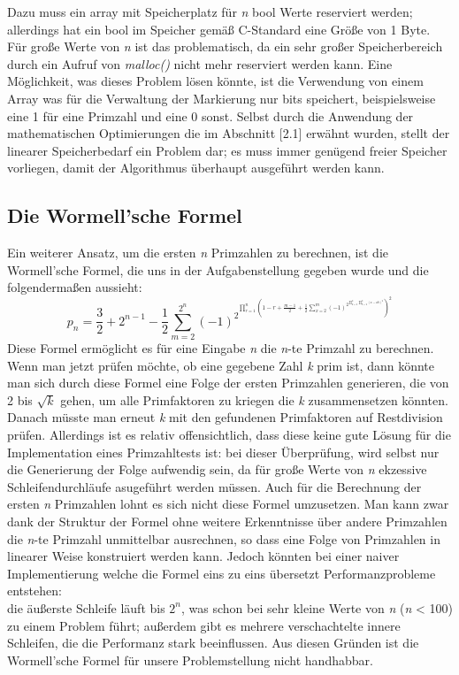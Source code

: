 \documentclass[course=erap]{aspdoc}
\begin{document}
Dazu muss ein array mit Speicherplatz für \textit{n} bool Werte reserviert werden; allerdings 
hat ein bool im Speicher gemäß C-Standard eine Größe von 1 Byte. 
Für große Werte von \textit{n} ist das problematisch, da ein sehr großer Speicherbereich durch ein Aufruf von \textit{malloc()} nicht mehr reserviert werden kann. Eine Möglichkeit, was dieses Problem lösen könnte, ist die Verwendung von einem Array was für die Verwaltung der Markierung nur bits speichert, beispielsweise eine 1 für eine Primzahl und eine 0 sonst. Selbst durch die Anwendung der mathematischen Optimierungen die im Abschnitt [2.1] erwähnt wurden, stellt der linearer Speicherbedarf ein Problem dar; es muss immer genügend freier Speicher vorliegen, damit der Algorithmus überhaupt ausgeführt werden kann. 
\subsection{Die Wormell'sche Formel}
Ein weiterer Ansatz, um die ersten \textit{n} Primzahlen zu berechnen, ist die Wormell’sche Formel, die uns in der Aufgabenstellung gegeben wurde und die folgendermaßen aussieht: $$
p_{n} = \frac{3}{2} + 2^{n - 1} - \frac{1}{2} \sum_{m=2}^{2^n} (-1)^{2^{\prod_{r=1}^{n} \left(1-r + \frac{m-1}{2} + \frac{1}{2} \sum_{x=2}^{m} (-1)^{2^{\prod_{a=2}^{x} \prod_{b=2}^{x} (x-ab)^2}}\right)^2}}
$$
Diese Formel ermöglicht es für eine Eingabe \textit{n} die \textit{n}-te Primzahl zu berechnen. Wenn man jetzt prüfen möchte, ob eine gegebene Zahl \textit{k} prim ist, dann könnte man sich durch diese Formel eine Folge der ersten Primzahlen generieren, die von 2 bis $\sqrt{k}$ gehen, um alle Primfaktoren zu kriegen die \textit{k} zusammensetzen könnten. Danach müsste man erneut \textit{k} mit den gefundenen Primfaktoren auf Restdivision prüfen. Allerdings ist es relativ offensichtlich, dass diese keine gute Lösung für die  Implementation eines Primzahltests ist: bei dieser Überprüfung, wird selbst nur die Generierung der Folge aufwendig sein, da für große Werte von \textit{n} ekzessive Schleifendurchläufe asugeführt werden müssen. Auch für die Berechnung der ersten \textit{n} Primzahlen lohnt es sich nicht diese Formel umzusetzen. Man kann zwar dank der Struktur der Formel ohne weitere Erkenntnisse über andere Primzahlen die \textit{n}-te Primzahl unmittelbar ausrechnen, so dass eine Folge von Primzahlen in linearer Weise konstruiert werden kann. Jedoch könnten bei einer naiver Implementierung welche die Formel eins zu eins übersetzt Performanzprobleme entstehen: \\ die äußerste Schleife läuft bis $2^n$, was schon bei sehr kleine Werte von \textit{n}
(\textit{n} < 100) zu einem Problem führt; außerdem gibt es mehrere verschachtelte innere Schleifen, die die Performanz stark beeinflussen. Aus diesen Gründen ist die Wormell'sche Formel für unsere Problemstellung nicht handhabbar. 
\end{document}
